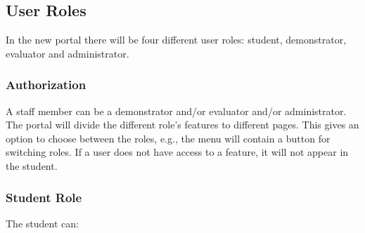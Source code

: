 \subsection{User Roles}
\label{user-roles}
In the new portal there will be four different user roles: student, demonstrator, evaluator and administrator. 

\subsubsection{Authorization}
A staff member can be a demonstrator and/or evaluator and/or administrator. The portal will divide the different role's features to different pages. This gives an option to choose between the roles, e.g., the menu will contain a button for switching roles. If a user does not have access to a feature, it will not appear in the student.

\subsubsection{Student Role}

The student can:

